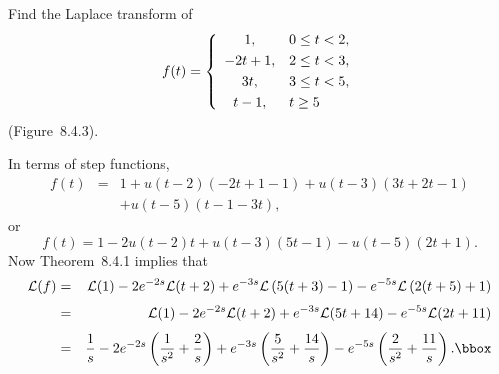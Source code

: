 \setcounter{example}{3}
\setcounter{equation}{6}
\begin{example}
  \label{example:8.4.4}\rm Find the Laplace transform of
  \begin{equation}
    \label{eq:8.4.7}f(t)=\left\{
    \begin{array}{cl}
      1,     & 0\le t<2, \\[1\jot]
      -2t+1, & 2\le t<3, \\[1\jot]
      3t,    & 3\le t<5, \\[1\jot]
      t-1,   & t\ge5
    \end{array}\right.
  \end{equation}
  (Figure~8.4.3).
\end{example}
\begin{examplesolution}
\solution In terms of step functions,
\begin{eqnarray*}
  f(t) & = & 1+u(t-2)(-2t+1-1)+u(t-3)(3t+2t-1) \\
       &   & +u(t-5)(t-1-3t),
\end{eqnarray*}
or
\[
  f(t)=1-2u(t-2)t+u(t-3)(5t-1)-u(t-5)(2t+1).
\]
Now Theorem~8.4.1 implies that
\begin{eqnarray*}
  {\cal L}(f) & = & {\cal L}(1)-2e^{-2s}{\cal L}(t+2)+e^{-3s}{\cal L}\left(5(t+3)-1\right)-e^{-5s}{\cal L}\left(2(t+5)+1\right) \\[1\jot]
              & = & {\cal L}(1)-2e^{-2s}{\cal L}(t+2)+e^{-3s}{\cal L}(5t+14)-e^{-5s}{\cal L}(2t+11)                             \\[1\jot]
              & = & \frac{1}{s}-2e^{-2s}\left(\frac{1}{s^{2}}+\frac{2}{s}\right)+e^{-3s}\left(\frac{5}{s^{2}}+\frac{14}{s}\right)-e^{-5s}\left(\frac{2}{s^{2}}+\frac{11}{s}\right).\bbox
\end{eqnarray*}
\end{examplesolution}

